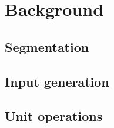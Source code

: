 \chapter{Background}\label{chap:background}
\begin{overview}

\end{overview}

\section{Segmentation}

\section{Input generation}

\section{Unit operations}



